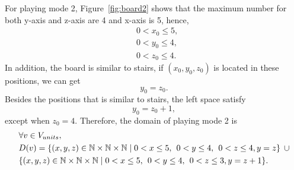 For playing mode 2, Figure~\ref{fig:board2} shows that the maximum number for both y-axis and z-axis are 4 and x-axis is 5, hence, 
\begin{equation}
\begin{aligned}
&0<x_{0}\leq5,\\
&0<y_{0}\leq4,\\
&0<z_{0}\leq4.
\end{aligned}
\end{equation}
In addition, the board is similar to stairs, if $(x_{0},y_{0},z_{0})$ is located in these positions, we can get
\begin{equation}
y_{0}=z_{0}.
\end{equation}
Besides the positions that is similar to stairs, the left space satisfy 
\begin{equation}
y_{0}=z_{0}+1,
\end{equation}
except when $z_{0}=4$.
Therefore, the domain of playing mode 2 is
\begin{equation}
\begin{aligned}
&\forall v \in V_{units},\\
&D(v)=\{(x,y,z) \in \mathbb{N} \times \mathbb{N}	\times \mathbb{N} \mid  0<x \leq 5 , \hspace{1ex} 0<y \leq 4,\hspace{1ex} 0<z \leq 4,y=z\} \hspace{1ex}\cup\\
&\{(x,y,z) \in \mathbb{N} \times \mathbb{N}	\times \mathbb{N} \mid  0<x \leq 5, \hspace{1ex} 0<y \leq 4,\hspace{1ex} 0<z \leq 3,y=z+1\}.
\end{aligned}
\end{equation}
